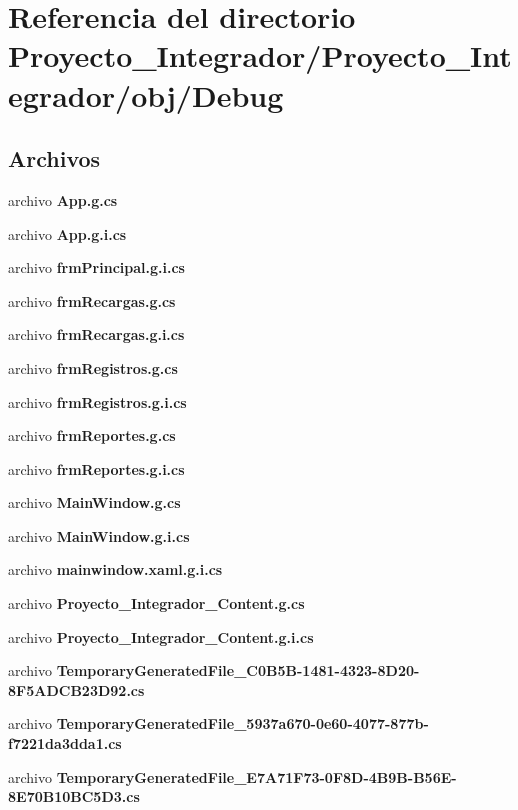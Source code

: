 \section{Referencia del directorio Proyecto\-\_\-\-Integrador/\-Proyecto\-\_\-\-Integrador/obj/\-Debug}
\label{dir_1746c685d9e0e6ff5d1660574667eb5f}
\subsection*{Archivos}
\begin{DoxyCompactItemize}
\item 
archivo {\bf App.\-g.\-cs}
\item 
archivo {\bf App.\-g.\-i.\-cs}
\item 
archivo {\bf frm\-Principal.\-g.\-i.\-cs}
\item 
archivo {\bf frm\-Recargas.\-g.\-cs}
\item 
archivo {\bf frm\-Recargas.\-g.\-i.\-cs}
\item 
archivo {\bf frm\-Registros.\-g.\-cs}
\item 
archivo {\bf frm\-Registros.\-g.\-i.\-cs}
\item 
archivo {\bf frm\-Reportes.\-g.\-cs}
\item 
archivo {\bf frm\-Reportes.\-g.\-i.\-cs}
\item 
archivo {\bf Main\-Window.\-g.\-cs}
\item 
archivo {\bf Main\-Window.\-g.\-i.\-cs}
\item 
archivo {\bf mainwindow.\-xaml.\-g.\-i.\-cs}
\item 
archivo {\bf Proyecto\-\_\-\-Integrador\-\_\-\-Content.\-g.\-cs}
\item 
archivo {\bf Proyecto\-\_\-\-Integrador\-\_\-\-Content.\-g.\-i.\-cs}
\item 
archivo {\bf Temporary\-Generated\-File\-\_\-C0\-B5\-B-\/1481-\/4323-\/8\-D20-\/8\-F5\-A\-D\-C\-B23\-D92.\-cs}
\item 
archivo {\bf Temporary\-Generated\-File\-\_\-5937a670-\/0e60-\/4077-\/877b-\/f7221da3dda1.\-cs}
\item 
archivo {\bf Temporary\-Generated\-File\-\_\-\-E7\-A71\-F73-\/0\-F8\-D-\/4\-B9\-B-\/\-B56\-E-\/8\-E70\-B10\-B\-C5\-D3.\-cs}
\end{DoxyCompactItemize}
